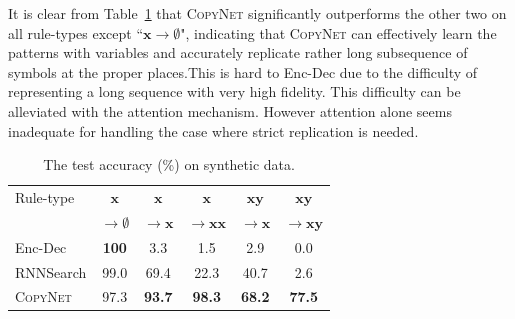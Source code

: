 
It is clear from Table~\ref{table-acc} that \textsc{CopyNet} significantly outperforms the other two on all rule-types except ``$\mathbf{x} \rightarrow \emptyset$", indicating that \textsc{CopyNet} can effectively learn the patterns with variables and accurately replicate rather long subsequence of symbols at the proper places.This is hard to Enc-Dec due to the difficulty of representing a long sequence with very high fidelity. This difficulty can be alleviated with the attention mechanism. However attention alone seems inadequate for handling the case where strict replication is needed. 
 \begin{table}[tb] %
\small
\centering
\begin{tabular}{lccccc}
\toprule
Rule-type& $\mathbf{x}$ &  $\mathbf{x}$ &   $\mathbf{x}$ &   $\mathbf{xy}$&    $\mathbf{xy}$ \\%
&  $\rightarrow \emptyset$ &  $\rightarrow\mathbf{x}$ &  $\rightarrow\mathbf{xx}$ &  $\rightarrow\mathbf{x}$&   $\rightarrow\mathbf{xy}$  \\
\midrule
Enc-Dec
& \textbf{100}  & 3.3 & 1.5 & 2.9 & 0.0\\
RNNSearch 
& 99.0  & 69.4 & 22.3 & 40.7 & 2.6\\
\midrule
\textsc{CopyNet}
& 97.3  & \textbf{93.7} & \textbf{98.3} & \textbf{68.2} & \textbf{77.5}\\
\bottomrule
\end{tabular} \vspace{-5pt}
\caption{\label{table-acc}  The test accuracy (\%) on synthetic data.}
\vspace{-16pt}
\end{table} %
